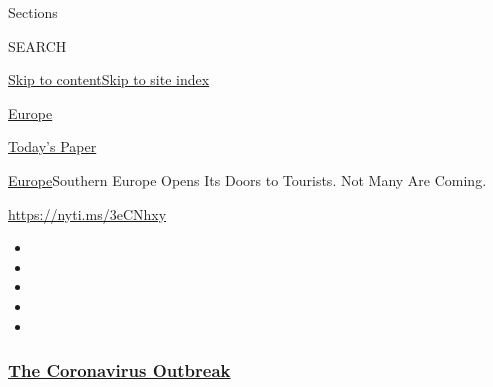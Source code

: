 Sections

SEARCH

\protect\hyperlink{site-content}{Skip to
content}\protect\hyperlink{site-index}{Skip to site index}

\href{https://www.nytimes3xbfgragh.onion/section/world/europe}{Europe}

\href{https://myaccount.nytimes3xbfgragh.onion/auth/login?response_type=cookie\&client_id=vi}{}

\href{https://www.nytimes3xbfgragh.onion/section/todayspaper}{Today's
Paper}

\href{/section/world/europe}{Europe}\textbar{}Southern Europe Opens Its
Doors to Tourists. Not Many Are Coming.

\url{https://nyti.ms/3eCNhxy}

\begin{itemize}
\item
\item
\item
\item
\item
\end{itemize}

\hypertarget{the-coronavirus-outbreak}{%
\subsubsection{\texorpdfstring{\href{https://www.nytimes3xbfgragh.onion/news-event/coronavirus?name=styln-coronavirus-national\&region=TOP_BANNER\&variant=undefined\&block=storyline_menu_recirc\&action=click\&pgtype=Article\&impression_id=4a3791a0-e386-11ea-87bd-65e9529ada0e}{The
Coronavirus
Outbreak}}{The Coronavirus Outbreak}}\label{the-coronavirus-outbreak}}

